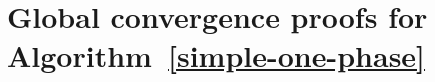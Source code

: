 \documentclass{article}
\begin{document}
%
%
%
%

\section{Global convergence proofs for Algorithm~\ref{simple-one-phase}}\label{app:global-conv}
\end{document}
